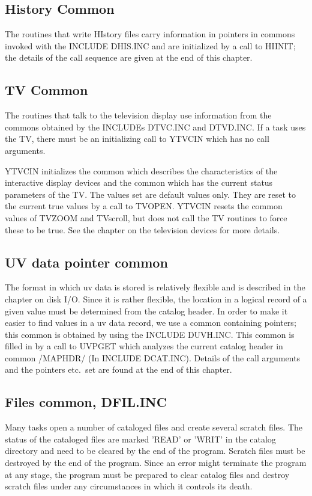 \subsection{History Common}
 The routines that write HIstory files carry information in pointers
in commons invoked with the INCLUDE DHIS.INC and are initialized by a
call to HIINIT; the details of the call sequence are given at the end
of this chapter.


\subsection{TV Common}
The routines that talk to the television display use information from
the commons obtained by the INCLUDEs DTVC.INC and DTVD.INC.  If a task
uses the TV, there must be an initializing call to YTVCIN which has no
call arguments.

YTVCIN initializes the common which describes the characteristics of
the interactive display devices and the common which has the current
status parameters of the TV. The values set are default values only.
They are reset to the current true values by a call to TVOPEN. YTVCIN
resets the common values of TVZOOM and TVscroll, but does not call the
TV routines to force these to be true. See the chapter on the
television devices for more details.

\subsection{UV data pointer common}
 The format in which uv data is stored is relatively flexible and is
described in the chapter on disk I/O.  Since it is rather flexible,
the location in a logical record of a given value must be determined
from the catalog header.  In order to make it easier to find values in
a uv data record, we use a common containing pointers; this common is
obtained by using the INCLUDE DUVH.INC.  This common is filled in by a
call to UVPGET which analyzes the current catalog header in common
/MAPHDR/ (In INCLUDE DCAT.INC).  Details of the call arguments and the
pointers etc.~set are found at the end of this chapter.

\subsection{Files common, DFIL.INC}
 Many tasks open a number of cataloged files and create several
scratch files.  The status of the cataloged files are marked 'READ' or
'WRIT' in the catalog directory and need to be cleared by the end of
the program.  Scratch files must be destroyed by the end of the
program. Since an error might terminate the program at any stage, the
program must be prepared to clear catalog files and destroy scratch
files under any circumstances in which it controls its death.

